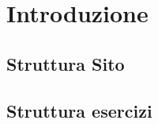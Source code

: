 \chapter*{Introduzione}
\section*{Struttura Sito}
\pagebreak

\section*{Struttura esercizi}
\pagebreak
